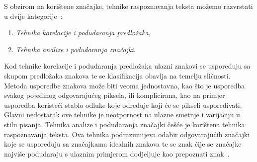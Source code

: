 S obzirom na korištene značajke, tehnike raspoznavanja teksta možemo razvrstati u dvije
kategorije\ \citep{govindan1989}:
\begin{enumerate}
    \item \emph{Tehnika korelacije i podudaranja predložaka},
    \item \emph{Tehnika analize i podudaranja značajki}.
\end{enumerate}
Kod tehnike korelacije i podudaranja predložaka ulazni znakovi se uspoređuju sa skupom predložaka znakova te se
klasifikacija obavlja na temelju sličnosti. Metoda usporedbe znakova može biti veoma jednostavna, kao što je usporedba
svakog pojedinog odgovarajućeg piksela, ili komplicirana, kao na primjer usporedba koristeći stablo odluke koje određuje
koji će se pikseli uspoređivati. Glavni nedostatak ove tehnike je neotpornost na ulazne smetnje i varijaciju u stilu
pisanja. Tehnika analize i podudaranja značajki češće je korištena tehnika raspoznavanja teksta. Ova tehnika
podrazumijeva odabir odgovarajućih značajki koje se uspoređuju sa značajkama idealnih znakova te se znak čije se
značajke najviše podudaraju s ulaznim primjerom dodjeljuje kao prepoznati znak\ \citep{govindan1989}.


